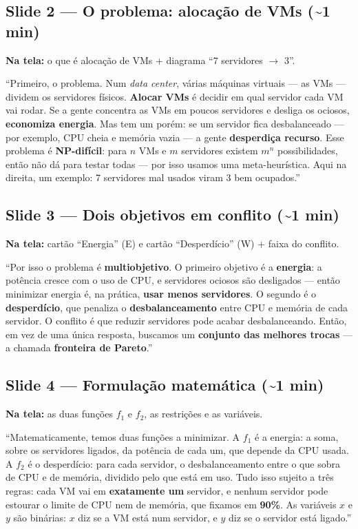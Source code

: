 \documentclass[11pt]{article}
\newcommand{\tela}[1]{\noindent\textcolor{tela}{\textbf{Na tela:} #1}\par\vspace{2pt}}
\newcommand{\tempo}[1]{\hfill\textcolor{cinza}{\small(\textasciitilde #1)}}
\begin{document}
\subsection{Slide 2 --- O problema: alocação de VMs \tempo{1 min}}
\tela{o que é alocação de VMs + diagrama ``7 servidores $\to$ 3''.}
\begin{fala}
``Primeiro, o problema. Num \emph{data center}, várias máquinas virtuais --- as
VMs --- dividem os servidores físicos. \textbf{Alocar VMs} é decidir em qual
servidor cada VM vai rodar. Se a gente concentra as VMs em poucos servidores e
desliga os ociosos, \textbf{economiza energia}. Mas tem um porém: se um servidor
fica desbalanceado --- por exemplo, CPU cheia e memória vazia --- a gente
\textbf{desperdiça recurso}. Esse problema é \textbf{NP-difícil}: para $n$ VMs e
$m$ servidores existem $m^n$ possibilidades, então não dá para testar todas ---
por isso usamos uma meta-heurística. Aqui na direita, um exemplo: 7 servidores
mal usados viram 3 bem ocupados.''
\end{fala}

\subsection{Slide 3 --- Dois objetivos em conflito \tempo{1 min}}
\tela{cartão ``Energia'' (E) e cartão ``Desperdício'' (W) + faixa do conflito.}
\begin{fala}
``Por isso o problema é \textbf{multiobjetivo}. O primeiro objetivo é a
\textbf{energia}: a potência cresce com o uso de CPU, e servidores ociosos são
desligados --- então minimizar energia é, na prática, \textbf{usar menos
servidores}. O segundo é o \textbf{desperdício}, que penaliza o
\textbf{desbalanceamento} entre CPU e memória de cada servidor. O conflito é que
reduzir servidores pode acabar desbalanceando. Então, em vez de uma única
resposta, buscamos um \textbf{conjunto das melhores trocas} --- a chamada
\textbf{fronteira de Pareto}.''
\end{fala}

\subsection{Slide 4 --- Formulação matemática \tempo{1 min}}
\tela{as duas funções $f_1$ e $f_2$, as restrições e as variáveis.}
\begin{fala}
``Matematicamente, temos duas funções a minimizar. A \textbf{$f_1$} é a energia:
a soma, sobre os servidores ligados, da potência de cada um, que depende da CPU
usada. A \textbf{$f_2$} é o desperdício: para cada servidor, o desbalanceamento
entre o que sobra de CPU e de memória, dividido pelo que está em uso. Tudo isso
sujeito a três regras: cada VM vai em \textbf{exatamente um} servidor, e nenhum
servidor pode estourar o limite de CPU nem de memória, que fixamos em
\textbf{90\%}. As variáveis $x$ e $y$ são binárias: $x$ diz se a VM está num
servidor, e $y$ diz se o servidor está ligado.''
\end{fala}
\end{document}
